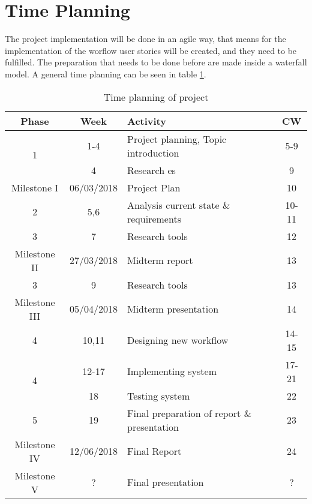\section{Time Planning}
The project implementation will be done in an agile way, that means for the implementation of the worflow user stories will be created, and they need to be fulfilled. The preparation that needs to be done before are made inside a waterfall model. A general time planning can be seen in table \ref{tab:timeplanning}. 
\begin{table} [h]
	\centering
	\begin{tabular}{|c|c|l|c|} \hline
		\rowcolor{Gray}Phase & Week & Activity & CW \\ \hline
		\multirow{2}{*}{1} & 1-4 & Project planning, Topic introduction & 5-9 \\
		& 4 & Research \gls{es} & 9 \\	\hline	
		Milestone I & 06/03/2018 & Project Plan & 10\\ \hline
		2 & 5,6 & Analysis current state \& requirements & 10-11  \\ \hline
		3 & 7 & Research tools & 12 \\ \hline
		Milestone II & 27/03/2018 & Midterm report & 13\\ \hline
		3 & 9 & Research tools & 13 \\ \hline
		Milestone III & 05/04/2018 & Midterm presentation & 14 \\ \hline
		4 & 10,11 & Designing new workflow & 14-15 \\
		\multirow{2}{*}{4} & 12-17 & Implementing system & 17-21 \\
		& 18 & Testing system & 22 \\ \hline
		5 & 19 & Final preparation of report \& presentation & 23 \\ \hline
		Milestone IV & 12/06/2018 & Final Report & 24\\ \hline
		Milestone V & ? & Final presentation & ? \\ \hline
	\end{tabular}
	\caption{Time planning of project}
	\label{tab:timeplanning}
\end{table}

